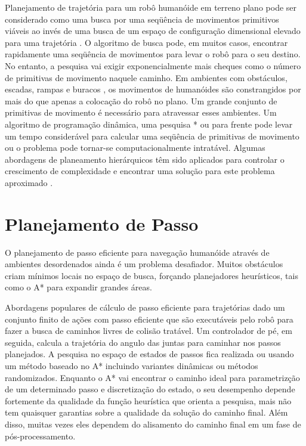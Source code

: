 Planejamento de trajetória para um robô humanóide em terreno plano pode ser considerado como uma busca por uma seqüência de movimentos
primitivos vi\'aveis ao inv\'es de uma busca de um espa\c {c}o de configura\c{c}\~ao dimensional elevado para uma trajetória \cite{bkuffner}. 
O algoritmo de busca pode, em muitos casos, encontrar rapidamente uma seqüência de movimentos para levar o robô para o seu destino. No entanto,
a pesquisa vai exigir exponencialmente mais cheques como o número de primitivas de movimento naquele caminho. Em ambientes com obstáculos, 
escadas, rampas e buracos , os movimentos de humanóides são constrangidos por mais do que apenas a colocação do robô no plano. Um grande 
conjunto de primitivas de movimento é necessário para atravessar esses ambientes. Um algoritmo de programação dinâmica, uma pesquisa * ou
para frente pode levar um tempo considerável para calcular uma seqüência de primitivas de movimento ou o problema pode tornar-se 
computacionalmente intratável. Algumas abordagens de planeamento hierárquicos têm sido aplicados para controlar o crescimento de complexidade 
e encontrar uma solução para este problema aproximado \cite{pchesnutt}.

\section{Planejamento de Passo}
O planejamento de passo eficiente para navegação humanóide através de ambientes desordenados ainda é um problema desafiador. Muitos obstáculos
criam mínimos locais no espaço de busca, forçando planejadores heurísticos, tais como o A* para expandir grandes áreas.

Abordagens populares de cálculo de passo eficiente para trajetórias dado um conjunto finito de ações com passo eficiente que são executáveis
pelo robô para fazer a busca de caminhos livres de colisão tratável. Um controlador de pé, em seguida, calcula a trajetória do angulo das juntas 
para caminhar nos passos planejados. A pesquisa no espaço de estados de passos fica realizada ou usando um método baseado no A* incluindo variantes dinâmicas 
\cite{phornung} \cite{pgarimort} ou métodos randomizados\cite{bperrin}. Enquanto o A* vai encontrar o caminho ideal para parametrizção de um 
determinado passo e discretização do estado, o seu desempenho depende fortemente da qualidade da função heurística que orienta a pesquisa, mais não 
tem quaisquer garantias sobre a qualidade da solução do caminho final. Além disso, muitas vezes eles dependem do alisamento do caminho 
final em um fase de pós-processamento.

